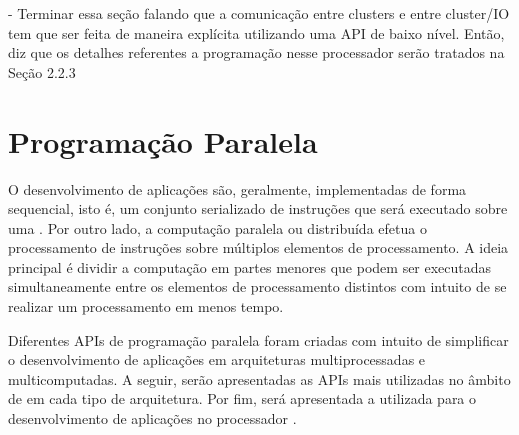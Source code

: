 - Terminar essa seção falando que a comunicação entre clusters e entre cluster/IO tem
que ser feita de maneira explícita utilizando uma API de baixo nível. Então, diz que os detalhes
referentes a programação nesse processador serão tratados na Seção 2.2.3




\section{Programação Paralela}

O desenvolvimento de aplicações são, geralmente, implementadas de forma
sequencial, isto é, um conjunto serializado de instruções que será executado
sobre uma \cpu. Por outro lado, a computação paralela ou distribuída efetua o
processamento de instruções sobre múltiplos elementos de processamento. A ideia
principal é dividir a computação em partes menores que podem ser executadas
simultaneamente entre os elementos de processamento distintos com intuito de se
realizar um processamento em menos tempo.

Diferentes APIs de programação paralela foram criadas com intuito de simplificar
o desenvolvimento de aplicações em arquiteturas multiprocessadas e multicomputadas.
A seguir, serão apresentadas as APIs mais utilizadas no âmbito de \hpc em cada tipo de
arquitetura. Por fim, será apresentada a \api utilizada para o desenvolvimento de aplicações
no processador \mppa.


